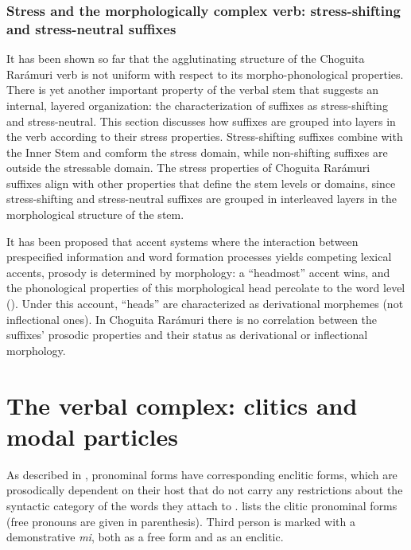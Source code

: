\subsubsection{Stress and the morphologically complex verb: stress-shifting and stress-neutral suffixes}
\label{subsubsec: Stress and the verb: stress-shifting and stress-neutral suffixes}

It has been shown so far that the agglutinating structure of the Choguita Rarámuri verb is not uniform with respect to its morpho-phonological properties. There is yet another important property of the verbal stem that suggests an internal, layered organization: the characterization of suffixes as stress-shifting and stress-neutral. This section discusses how suffixes are grouped into layers in the verb according to their stress properties. Stress-shifting suffixes combine with the Inner Stem and comform the stress domain, while non-shifting suffixes are outside the stressable domain. The stress properties of Choguita Rarámuri suffixes align with other properties that define the stem levels or domains, since stress-shifting and stress-neutral suffixes are grouped in interleaved layers in the morphological structure of the stem.

It has been proposed that accent systems where the interaction between prespecified information and word formation processes yields competing lexical accents, prosody is determined by morphology: a ``headmost'' accent wins, and the phonological properties of this morphological head percolate to the word level (\citealt[3--4]{revithiadou1998lexical}). Under this account, ``heads'' are characterized as derivational morphemes (not inflectional ones). In Choguita Rarámuri there is no correlation between the suffixes’ prosodic properties and their status as derivational or inflectional morphology.


\section{The verbal complex: clitics and modal particles}
\label{sec: the verbal complex clitics and modal particles}

As described in , pronominal forms have corresponding enclitic forms, which are prosodically dependent  on their host that do not carry any restrictions about the syntactic category of the words they attach to \parencite{bickel2007inflectional}.  lists the clitic pronominal forms (free pronouns are given in parenthesis). Third person is marked with  a demonstrative \textit{mi}, both as a free form and as an enclitic.

